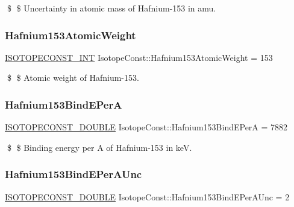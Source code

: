 \$ \$ Uncertainty in atomic mass of Hafnium-\/153 in amu. \mbox{\label{group___isotope_const-_hafnium-_hf153_ga8e547bf3f6c26dd9dbd3f74e892903e1}} 
\subsubsection{\texorpdfstring{Hafnium153\+Atomic\+Weight}{Hafnium153AtomicWeight}}
{\footnotesize\ttfamily \mbox{\hyperlink{group___isotope_const-_macros_ga5f18360b3e99483a35c32d789e62621c}{I\+S\+O\+T\+O\+P\+E\+C\+O\+N\+S\+T\+\_\+\+I\+NT}} Isotope\+Const\+::\+Hafnium153\+Atomic\+Weight = 153}

\$ \$ Atomic weight of Hafnium-\/153. \mbox{\label{group___isotope_const-_hafnium-_hf153_ga3fcd11fdf1a47e38131eb7b7e41b7416}} 
\subsubsection{\texorpdfstring{Hafnium153\+Bind\+E\+PerA}{Hafnium153BindEPerA}}
{\footnotesize\ttfamily \mbox{\hyperlink{group___isotope_const-_macros_ga8f45a7272ce02c0b4c65c44636ed719a}{I\+S\+O\+T\+O\+P\+E\+C\+O\+N\+S\+T\+\_\+\+D\+O\+U\+B\+LE}} Isotope\+Const\+::\+Hafnium153\+Bind\+E\+PerA = 7882}

\$ \$ Binding energy per A of Hafnium-\/153 in keV. \mbox{\label{group___isotope_const-_hafnium-_hf153_ga9d4b8c6040b19f8692606e9a93733e0e}} 
\subsubsection{\texorpdfstring{Hafnium153\+Bind\+E\+Per\+A\+Unc}{Hafnium153BindEPerAUnc}}
{\footnotesize\ttfamily \mbox{\hyperlink{group___isotope_const-_macros_ga8f45a7272ce02c0b4c65c44636ed719a}{I\+S\+O\+T\+O\+P\+E\+C\+O\+N\+S\+T\+\_\+\+D\+O\+U\+B\+LE}} Isotope\+Const\+::\+Hafnium153\+Bind\+E\+Per\+A\+Unc = 2}

